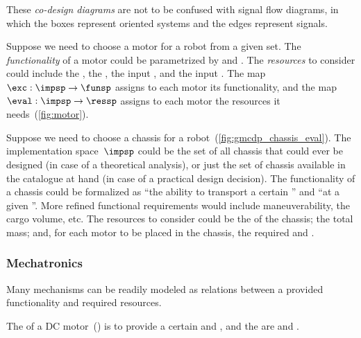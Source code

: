 These \emph{co-design diagrams} are not to be confused with signal
flow diagrams, in which the boxes represent oriented systems and the
edges represent signals.


\begin{example}
\label{exa:motor}Suppose we need to choose a motor for a robot from
a given set. The \emph{functionality} of a motor could be parametrized
by  and . The \emph{resources} to consider
could include the , the , the
input , and the input .
The map~$\exc:\impsp\rightarrow\funsp$ assigns to each motor its
functionality, and the map~$\eval:\impsp\rightarrow\ressp$ assigns
to each motor the resources it needs~(\cref{fig:motor}).
\end{example}


\begin{example}
\label{exa:chassis}Suppose we need to choose a chassis for a robot~(\cref{fig:gmcdp_chassis_eval}).
The implementation space~$\impsp$ could be the set of all chassis
that could ever be designed (in case of a theoretical analysis), or
just the set of chassis available in the catalogue at hand (in case
of a practical design decision). The functionality of a chassis could
be formalized as ``the ability to transport a certain '' and ``at a given ''. More refined
functional requirements would include maneuverability, the cargo volume,
etc. The resources to consider could be the  of
the chassis; the total mass; and, for each motor to be placed in the
chassis, the required  and .
\end{example}
 

\subsubsection{Mechatronics}


Many mechanisms can be readily modeled as relations between a provided
functionality and required resources.


\begin{example}
The  of a DC motor~()
is to provide a certain  and , and the 
are  and .
\end{example}

